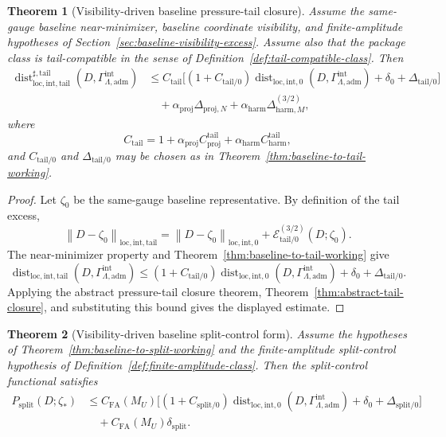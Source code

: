 \documentclass[11pt]{article}
\numberwithin{equation}{section}
\newtheorem{theorem}{Theorem}[section]
\theoremstyle{definition}
\theoremstyle{remark}
\DeclareMathOperator{\dist}{dist}
\newcommand{\loc}{\mathrm{loc}}
\newcommand{\intg}{\mathrm{int}}
\newcommand{\tail}{\mathrm{tail}}
\newcommand{\spl}{\mathrm{split}}
\newcommand{\adm}{\mathrm{adm}}
\newcommand{\proj}{\mathrm{proj}}
\newcommand{\harm}{\mathrm{harm}}
\newcommand{\norm}[2]{\left\|#1\right\|_{#2}}
\newcommand{\calE}{\mathcal E}
\newcommand{\Gammaadm}{\Gamma^{\intg}_{\Lambda,\adm}}
\begin{document}
\begin{theorem}[Visibility-driven baseline pressure-tail closure]
\label{thm:baseline-pressure-tail-closure}
Assume the same-gauge baseline near-minimizer, baseline coordinate visibility,
and finite-amplitude hypotheses of Section~\ref{sec:baseline-visibility-excess}.
Assume also that the package class is tail-compatible in the sense of
Definition~\ref{def:tail-compatible-class}.  Then
\[
\begin{aligned}
    \dist^{\sharp,\tail}_{\loc,\intg,\tail}(D,\Gammaadm)
    &\le
    C_{\tail}
    \bigl[
        (1+C_{\tail/0})
        \dist_{\loc,\intg,0}(D,\Gammaadm)
        +
        \delta_0
        +
        \Delta_{\tail/0}
    \bigr]
\\
    &\quad+
    \alpha_{\proj}\Delta_{\proj,N}
    +
    \alpha_{\harm}\Delta^{(3/2)}_{\harm,M},
\end{aligned}
\]
where
\[
    C_{\tail}=1+\alpha_{\proj}C^{\tail}_{\proj}
    +\alpha_{\harm}C^{\tail}_{\harm},
\]
and \(C_{\tail/0}\) and \(\Delta_{\tail/0}\) may be chosen as in
Theorem~\ref{thm:baseline-to-tail-working}.
\end{theorem}

\begin{proof}
Let \(\zeta_0\) be the same-gauge baseline representative.  By definition of
the tail excess,
\[
    \norm{D-\zeta_0}{\loc,\intg,\tail}
    =
    \norm{D-\zeta_0}{\loc,\intg,0}
    +
    \calE_{\tail/0}^{(3/2)}(D;\zeta_0).
\]
The near-minimizer property and Theorem~\ref{thm:baseline-to-tail-working}
give
\[
    \dist_{\loc,\intg,\tail}(D,\Gammaadm)
    \le
    (1+C_{\tail/0})
    \dist_{\loc,\intg,0}(D,\Gammaadm)
    +
    \delta_0
    +
    \Delta_{\tail/0}.
\]
Applying the abstract pressure-tail closure theorem, Theorem~\ref{thm:abstract-tail-closure}, and substituting this bound gives
the displayed estimate.
\end{proof}

\begin{theorem}[Visibility-driven baseline split-control form]
\label{thm:baseline-split-control}
Assume the hypotheses of Theorem~\ref{thm:baseline-to-split-working} and the
finite-amplitude split-control hypothesis of Definition~\ref{def:finite-amplitude-class}.
Then the split-control functional satisfies
\[
\begin{aligned}
    P_{\spl}(D;\zeta_*)
    &\le
    C_{\mathrm{FA}}(M_U)
    \bigl[
        (1+C_{\spl/0})
        \dist_{\loc,\intg,0}(D,\Gammaadm)
        +
        \delta_0
        +
        \Delta_{\spl/0}
    \bigr]
\\
    &\quad+
    C_{\mathrm{FA}}(M_U)\delta_{\spl}.
\end{aligned}
\]
\end{theorem}
\end{document}
